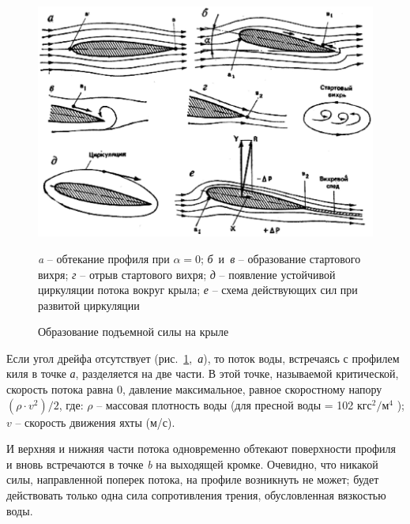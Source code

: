 \documentclass[a4paper, 12pt, twoside, final, book, russian, fittopage, cyremdash]{ncc}
\begin{document}
\begin{figure}[htb]
  \centering
  \includegraphics[scale=0.5]{0008_Podemn_sila.jpg}
  \caption{Образование подъемной силы на крыле}
  \label{fig:8}
  \centering{}\small \textit{a} \--- обтекание профиля при $\alpha = 0$;
                     \textit{б}~и~\textit{в} \--- образование стартового вихря;
                     \textit{г} \--- отрыв стартового вихря;
                     \textit{д} \--- появление устойчивой циркуляции потока вокруг крыла;
                     \textit{е} \--- схема действующих сил при развитой циркуляции
\end{figure}

Если угол дрейфа отсутствует (рис.~\ref{fig:8},~\textit{а}), то поток воды, встречаясь с профилем киля в точке \textit{а}, разделяется на две части. В этой точке, называемой критической, скорость потока равна 0, давление максимальное, равное скоростному напору $(\rho \cdot v^2) / 2$, где: $\rho$ \--- массовая плотность воды (для пресной воды = 102 $\text{кгс}^2 / \text{м}^4$ ); $v$ \--- скорость движения яхты (м/с). 

И верхняя и нижняя части потока одновременно обтекают поверхности профиля и вновь встречаются в точке \textit{b} на выходящей кромке. Очевидно, что никакой силы, направленной поперек потока, на профиле возникнуть не может; будет действовать только одна сила сопротивления трения, обусловленная вязкостью воды. 
\end{document}
